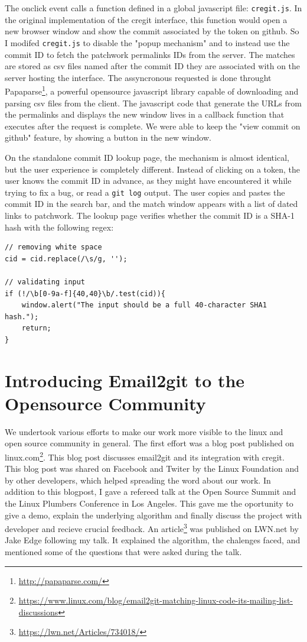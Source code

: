 The onclick event calls a function defined in a global javascript file: \texttt{cregit.js}. In the original implementation of the cregit interface, this function would open a new browser window and show the commit associated by the token on github. So I modifed \texttt{cregit.js} to disable the "popup mechanism" and to instead use the commit ID to fetch the patchwork permalinks IDs from the server. The matches are stored as csv files named after the commit ID they are associated with on the server hosting the interface. The assyncronous requested is done throught Papaparse\footnote{\url{http://papaparse.com/}}, a powerful opensource javascript library capable of downloading and parsing csv files from the client. The javascript code that generate the URLs from the permalinks and displays the new window lives in a callback function that executes after the request is complete. We were able to keep the "view commit on github" feature, by showing a button in the new window.  

On the standalone commit ID lookup page, the mechanism is almost identical, but the user experience is completely different. Instead of clicking on a token, the user knows the commit ID in advance, as they might have encountered it while trying to fix a bug, or read a \texttt{git log} output. The user copies and pastes the commit ID in the search bar, and the match window appears with a list of dated links to patchwork. The lookup page verifies whether the commit ID is a SHA-1 hash with the following regex:

\begin{lstlisting}
// removing white space
cid = cid.replace(/\s/g, '');

// validating input
if (!/\b[0-9a-f]{40,40}\b/.test(cid)){
    window.alert("The input should be a full 40-character SHA1 hash.");
    return;
}
\end{lstlisting}





\section{Introducing Email2git to the Opensource Community}

We undertook various efforts to make our work more visible to the linux and open source community in general. The first effort was a blog post published on linux.com\footnote{\url{https://www.linux.com/blog/email2git-matching-linux-code-its-mailing-list-discussions}}. This blog post discusses email2git and its integration with cregit. This blog post was shared on Facebook and Twiter by the Linux Foundation and by other developers, which helped spreading the word about our work. In addition to this blogpost, I gave a refereed talk at the Open Source Summit and the Linux Plumbers Conference in Los Angeles. This gave me the oportunity to give a demo, explain the underlying algorithm and finally discuss the project with developer and recieve crucial feedback. An article\footnote{\url{https://lwn.net/Articles/734018/}} was published on LWN.net by Jake Edge following my talk. It explained the algorithm, the chalenges faced, and mentioned some of the questions that were asked during the talk.


